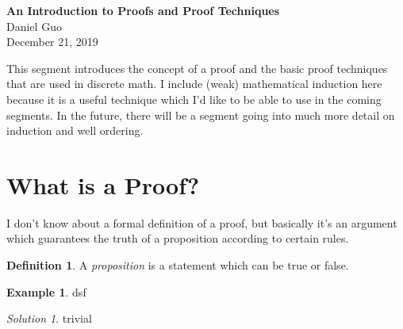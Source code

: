 \documentclass[12pt]{article}[letterpaper]
\theoremstyle{definition}
\newtheorem{definition}{Definition}
\newtheorem{example}{Example}
\theoremstyle{remark}
\theoremstyle{exercise}
\theoremstyle{nonumberplain}
\newtheorem{solution}{Solution}
\begin{document}
\begin{center}
{\Large \textbf{An Introduction to Proofs and Proof Techniques}} \\[5mm]
Daniel Guo \\[4mm]
December 21, 2019
\end{center}

\noindent This segment introduces the concept of a proof and the basic proof techniques that are used in discrete math. I include (weak) mathematical induction here because it is a useful technique which I'd like to be able to use in the coming segments. In the future, there will be a segment going into much more detail on induction and well ordering.

\section{What is a Proof?}
I don't know about a formal definition of a proof, but basically it's an argument which guarantees the truth of a proposition according to certain rules.
\begin{definition}
A \textit{proposition} is a statement which can be true or false.
\end{definition}
\begin{example}
dsf
\end{example}
\begin{solution}
trivial
\end{solution}
\end{document}
